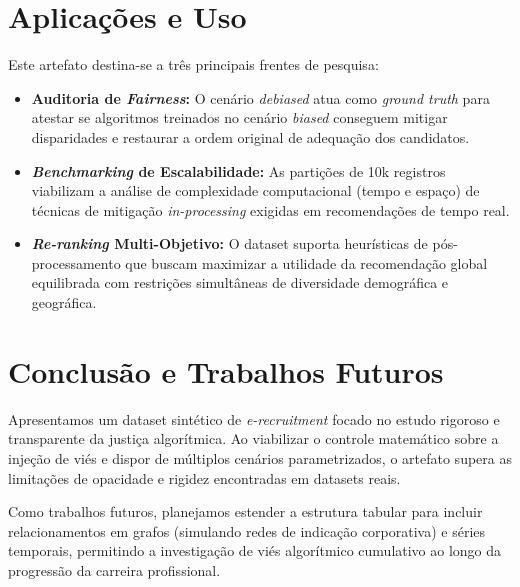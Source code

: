 \documentclass[12pt]{article}
\begin{document}
\section{Aplicações e Uso}

Este artefato destina-se a três principais frentes de pesquisa:

\begin{itemize}
    \item \textbf{Auditoria de \textit{Fairness}:} O cenário \textit{debiased} atua como \textit{ground truth} para atestar se algoritmos treinados no cenário \textit{biased} conseguem mitigar disparidades e restaurar a ordem original de adequação dos candidatos.
    \item \textbf{\textit{Benchmarking} de Escalabilidade:} As partições de 10k registros viabilizam a análise de complexidade computacional (tempo e espaço) de técnicas de mitigação \textit{in-processing} exigidas em recomendações de tempo real.
    \item \textbf{\textit{Re-ranking} Multi-Objetivo:} O dataset suporta heurísticas de pós-processamento que buscam maximizar a utilidade da recomendação global equilibrada com restrições simultâneas de diversidade demográfica e geográfica.
\end{itemize}

\section{Conclusão e Trabalhos Futuros}

Apresentamos um dataset sintético de \textit{e-recruitment} focado no estudo rigoroso e transparente da justiça algorítmica. Ao viabilizar o controle matemático sobre a injeção de viés e dispor de múltiplos cenários parametrizados, o artefato supera as limitações de opacidade e rigidez encontradas em datasets reais. 

Como trabalhos futuros, planejamos estender a estrutura tabular para incluir relacionamentos em grafos (simulando redes de indicação corporativa) e séries temporais, permitindo a investigação de viés algorítmico cumulativo ao longo da progressão da carreira profissional.
\end{document}
